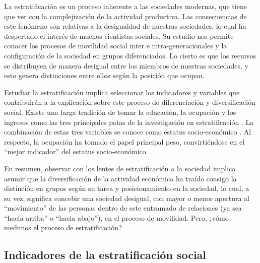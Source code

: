 \documentclass[
]{book}
\begin{document}
La estratificación es un proceso inherente a las sociedades modernas, que tiene que ver con la complejización de la actividad productiva. Las consecuencias de este fenómeno son relativas a la desigualdad de nuestras sociedades, lo cual ha despertado el interés de muchos cientistas sociales. Su estudio nos permite conocer los procesos de movilidad social inter e intra-generacionales y la configuración de la sociedad en grupos diferenciados. Lo cierto es que los recursos se distribuyen de manera desigual entre los miembros de nuestras sociedades, y esto genera distinciones entre ellos según la posición que ocupan.

Estudiar la estratificación implica seleccionar los indicadores y variables que contribuirán a la explicación sobre este proceso de diferenciación y diversificación social. Existe una larga tradición de tomar la educación, la ocupación y los ingresos como las tres principales patas de la investigación en estratificación \citep{Fujihara2020}. La combinación de estas tres variables se conoce como estatus socio-económico \citep{Sno.Ganzeboom2017}. Al respecto, la ocupación ha tomado el papel principal peso, convirtiéndose en el ``mejor indicador'' \citep{Blau.Duncan1967} del estatus socio-económico.

En resumen, observar con los lentes de estratificación a la sociedad implica asumir que la diversificación de la actividad económica ha traído consigo la distinción en grupos según su tarea y posicionamiento en la sociedad, lo cual, a su vez, significa concebir una sociedad desigual, con mayor o menor apertura al ``movimiento'' de las personas dentro de este entramado de relaciones (ya sea ``hacia arriba'' o ``hacia abajo''), en el proceso de movilidad. Pero, ¿cómo medimos el proceso de estratificación?

\hypertarget{indicadores-de-la-estratificaciuxf3n-social}{%
\subsection{Indicadores de la estratificación social}\label{indicadores-de-la-estratificaciuxf3n-social}}
\end{document}
